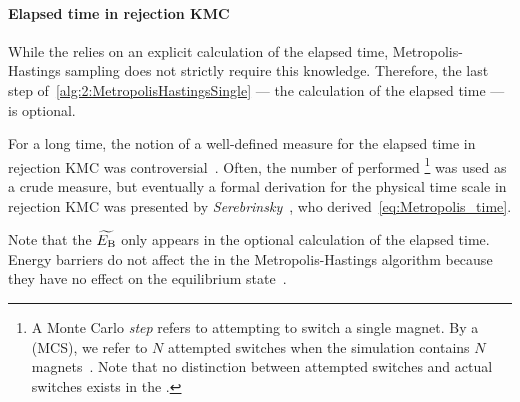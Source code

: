 \paragraph{Elapsed time in rejection KMC}
While the  relies on an explicit calculation of the elapsed time, Metropolis-Hastings sampling does not strictly require this knowledge.
Therefore, the last step of~\cref{alg:2:MetropolisHastingsSingle} --- the calculation of the elapsed time --- is optional. \par
For a long time, the notion of a well-defined measure for the elapsed time in rejection KMC was controversial~\cite{nfoldMCalgorithm,GlauberTimescale_sadiq1984,MCSim_StatPhys}. %
Often, the number of performed \footnote{
	A Monte Carlo \textit{step} refers to attempting to switch a single magnet.
	By a  (MCS), we refer to $N$ attempted switches when the simulation contains $N$ magnets~\cite{NumericalDynamicalNiedermayer}. %
	Note that no distinction between attempted switches and actual switches exists in the .
} was used as a crude measure, but eventually a formal derivation for the physical time scale in rejection KMC was presented by \textit{Serebrinsky}~\cite{PhysicalTimeKMC}, who derived~\cref{eq:Metropolis_time}. \par
Note that the  $\widetilde{E_\mathrm{B}}$ only appears in the optional calculation of the elapsed time.
Energy barriers do not affect the  in the Metropolis-Hastings algorithm because they have no effect on the equilibrium state~\cite{DynamicalGlassyBehaviour}.

